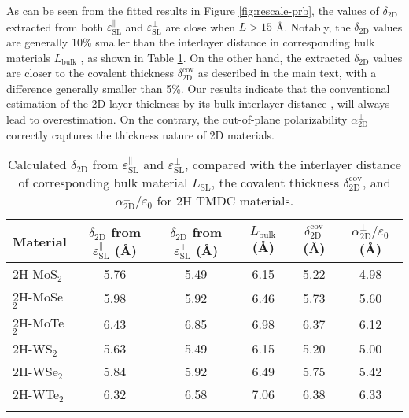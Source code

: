 \documentclass[manuscript=suppinfo,email=true,hyperref=true,keywords=false]{achemso}
\begin{document}
As can be seen from the fitted results in Figure
\ref{fig:rescale-prb}, the values of $\delta_{\mathrm{2D}}$ extracted
from both $\varepsilon_{\mathrm{SL}}^{\parallel}$ and
$\varepsilon_{\mathrm{SL}}^{\perp}$ are close when $L> 15$
{\AA}. Notably, the $\delta_{\mathrm{2D}}$ values are generally 10\%
smaller than the interlayer distance in corresponding bulk materials
$L_{\mathrm{bulk}}$ , as shown in Table \ref{tab:delta-L-DFt}. On the
other hand, the extracted $\delta_{\mathrm{2D}}$ values are closer to
the covalent thickness $\delta_{\mathrm{2D}}^{\mathrm{cov}}$ as
described in the main text, with a difference generally smaller than
5\%. Our results indicate that the conventional estimation of the 2D
layer thickness by its bulk interlayer distance
\cite{Matthes_2016,Laturia_2018}, will always lead to
overestimation. On the contrary, the out-of-plane polarizability
$\alpha_{\mathrm{2D}}^{\perp}$ correctly captures the thickness nature
of 2D materials.

\begin{table}[htbp]
  \centering
  \begin{tabular}[htbp]{lccccc}
  \hline{}
  Material & $\delta_{\mathrm{2D}}$ from $\varepsilon_{\mathrm{SL}}^{\parallel}$ ({\AA}) & $\delta_{\mathrm{2D}}$ from $\varepsilon_{\mathrm{SL}}^{\perp}$ ({\AA})& $L_{\mathrm{bulk}}$ ({\AA}) & $\delta_{\mathrm{2D}}^{\mathrm{cov}}$ ({\AA}) & $\alpha_{\mathrm{2D}}^{\perp}/\varepsilon_{0}$ ({\AA})\\
  \hline{}
  2H-MoS$_{2}$ & 5.76 & 5.49 & 6.15 & 5.22 & 4.98\\
  2H-MoSe$_{2}$ & 5.98 & 5.92 & 6.46 &  5.73 & 5.60\\
  2H-MoTe$_{2}$ & 6.43 & 6.85 & 6.98 & 6.37 & 6.12\\
  2H-WS$_{2}$ & 5.63 & 5.49 & 6.15 & 5.20 & 5.00\\
  2H-WSe$_{2}$ & 5.84 & 5.92 & 6.49 & 5.75 & 5.42\\
  2H-WTe$_{2}$ & 6.32 & 6.58 & 7.06 & 6.38 & 6.33\\
  \hline{}
\end{tabular}

\caption{Calculated $\delta_{\mathrm{2D}}$ from
  $\varepsilon_{\mathrm{SL}}^{\parallel}$ and
  $\varepsilon_{\mathrm{SL}}^{\perp}$, compared with the interlayer
  distance of corresponding bulk material $L_{\mathrm{SL}}$, the
  covalent thickness $\delta_{\mathrm{2D}}^{\mathrm{cov}}$, and
  $\alpha_{\mathrm{2D}}^{\perp}/\varepsilon_{0}$ for 2H TMDC materials.}
\label{tab:delta-L-DFt}
\end{table}
\end{document}
